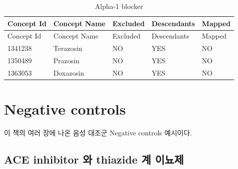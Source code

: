 \documentclass[10.5pt]{book}
\theoremstyle{definition}
\theoremstyle{definition}
\theoremstyle{definition}
\theoremstyle{remark}
\begin{document}
\begin{longtable}[]{@{}lllll@{}}
\caption{\label{tab:A1BUseA1Bs} Alpha-1 blocker}\tabularnewline
\toprule
Concept Id & Concept Name & Excluded & Descendants &
Mapped\tabularnewline
\midrule
\endfirsthead
\toprule
Concept Id & Concept Name & Excluded & Descendants &
Mapped\tabularnewline
\midrule
\endhead
1341238 & Terazosin & NO & YES & NO\tabularnewline
1350489 & Prazosin & NO & YES & NO\tabularnewline
1363053 & Doxazosin & NO & YES & NO\tabularnewline
\bottomrule
\end{longtable}

\chapter{Negative controls}\label{NegativeControlsAppendix}

이 책의 여러 장에 나온 음성 대조군 Negative controls 예시이다.

\section{ACE inhibitor 와 thiazide 계 이뇨제}\label{AceiThzNsc}
\end{document}
